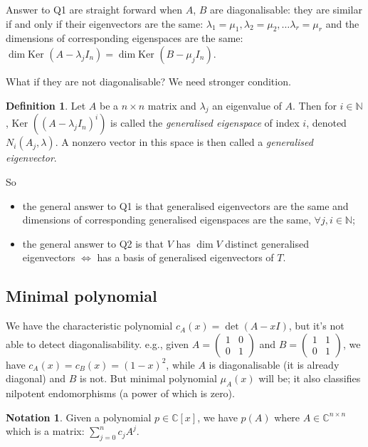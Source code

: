 \documentclass[a4paper]{article}
\newcommand{\Ker}{\text{Ker }}
\theoremstyle{definition}
\newtheorem{defn}{Definition}[subsection]
\newtheorem*{notation}{Notation}
\begin{document}
Answer to Q1 are straight forward when $A$, $B$ are diagonalisable: they are similar if and only if their eigenvectors are the same: $\lambda_1=\mu_1, \lambda_2=\mu_2,\ldots \lambda_r=\mu_r$ and the dimensions of corresponding eigenspaces are the same: $\dim \Ker (A-\lambda_j I_n) = \dim \Ker (B-\mu_j I_n)$.

What if they are not diagonalisable? We need stronger condition.

\begin{defn}
	Let $A$ be a $n\times n$ matrix and $\lambda_j$ an eigenvalue of $A$. Then for $i \in \mathbb N$, $\Ker \left( (A-\lambda_j I_n)^i \right)$ is called the \textit{generalised eigenspace} of index $i$, denoted $N_i (A_j, \lambda)$. A nonzero vector in this space is then called a \textit{generalised eigenvector}.
\end{defn}

So \begin{itemize}
	\item the general answer to Q1 is that generalised eigenvectors are the same and dimensions of corresponding generalised eigenspaces are the same, $\forall j,i \in \mathbb N$;
	\item the general answer to Q2 is that $V$ has $\dim V$ distinct generalised eigenvectors $\Leftrightarrow$ has a basis of generalised eigenvectors of $T$.
\end{itemize}

\subsection{Minimal polynomial}
We have the characteristic polynomial $c_{A}(x)=\det (A-xI)$, but it's not able to detect diagonalisability. e.g., given $A = \begin{pmatrix}
	1 & 0 \\ 0 & 1
\end{pmatrix}$ and $B = \begin{pmatrix}
	1 & 1 \\ 0 & 1
\end{pmatrix}$, we have $c_{A}(x)=c_{B}(x)=(1-x)^2$, while $A$ is diagonalisable (it is already diagonal) and $B$ is not. But minimal polynomial $\mu_{A}(x)$ will be; it also classifies nilpotent endomorphisms (a power of which is zero).

\begin{notation}
	Given a polynomial $p \in \mathbb C [x]$, we have $p(A)$ where $A \in \mathbb C^{n \times n}$ which is a matrix: $\displaystyle \sum_{j=0}^n c_j A^j$.
\end{notation}
\end{document}
